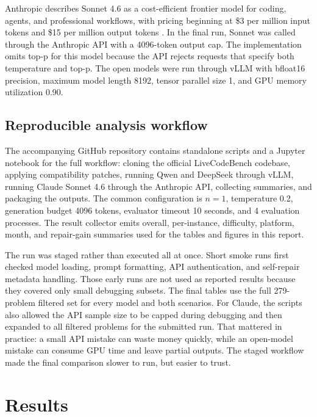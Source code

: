 \documentclass[11pt]{article}
\newcommand{\lcb}{LiveCodeBench}
\begin{document}
Anthropic describes Sonnet 4.6 as a cost-efficient frontier model for coding, agents, and professional workflows, with pricing beginning at \$3 per million input tokens and \$15 per million output tokens \citep{anthropic2026sonnet46}. In the final run, Sonnet was called through the Anthropic API with a 4096-token output cap. The implementation omits top-p for this model because the API rejects requests that specify both temperature and top-p. The open models were run through vLLM with bfloat16 precision, maximum model length 8192, tensor parallel size 1, and GPU memory utilization 0.90.

\subsection{Reproducible analysis workflow}
The accompanying GitHub repository contains standalone scripts and a Jupyter notebook for the full workflow: cloning the official \lcb{} codebase, applying compatibility patches, running Qwen and DeepSeek through vLLM, running Claude Sonnet 4.6 through the Anthropic API, collecting summaries, and packaging the outputs. The common configuration is $n=1$, temperature 0.2, generation budget 4096 tokens, evaluator timeout 10 seconds, and 4 evaluation processes. The result collector emits overall, per-instance, difficulty, platform, month, and repair-gain summaries used for the tables and figures in this report.

The run was staged rather than executed all at once. Short smoke runs first checked model loading, prompt formatting, API authentication, and self-repair metadata handling. Those early runs are not used as reported results because they covered only small debugging subsets. The final tables use the full 279-problem filtered set for every model and both scenarios. For Claude, the scripts also allowed the API sample size to be capped during debugging and then expanded to all filtered problems for the submitted run. That mattered in practice: a small API mistake can waste money quickly, while an open-model mistake can consume GPU time and leave partial outputs. The staged workflow made the final comparison slower to run, but easier to trust.

\section{Results}
\end{document}
